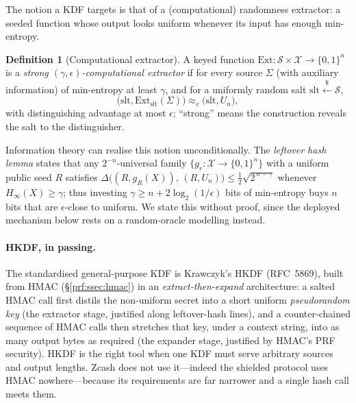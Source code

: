 \documentclass[11pt,a4paper]{article}
\theoremstyle{definition}
\newtheorem{definition}[theorem]{Definition}
\theoremstyle{remark}
\begin{document}
The notion a KDF targets is that of a (computational) randomness extractor: a seeded function whose output looks uniform whenever its input has enough min-entropy.

\begin{definition}[Computational extractor]\label{symmetric:def-extractor}
A keyed function \(\mathrm{Ext} : \mathcal{S} \times \mathcal{X} \to \{0,1\}^n\) is a \emph{strong \((\gamma, \epsilon)\)-computational extractor} if for every source \(\Sigma\) (with auxiliary information) of min-entropy at least \(\gamma\), and for a uniformly random salt \(\mathrm{slt} \xleftarrow{\$}\mathcal{S}\),
\[
  \bigl(\mathrm{slt}, \mathrm{Ext}_{\mathrm{slt}}(\Sigma)\bigr) \approx_c \bigl(\mathrm{slt}, U_n\bigr),
\]
with distinguishing advantage at most \(\epsilon\); ``strong'' means the construction reveals the salt to the distinguisher.
\end{definition}

Information theory can realise this notion unconditionally. The \emph{leftover hash lemma} states that any \(2^{-n}\)-universal family \(\{g_r : \mathcal{X} \to \{0,1\}^n\}\) with a uniform public seed \(R\) satisfies \(\Delta\bigl((R, g_R(X)),\, (R, U_n)\bigr) \le \tfrac12\sqrt{2^{\,n-\gamma}}\) whenever \(H_\infty(X) \ge \gamma\); thus investing \(\gamma \ge n + 2\log_2(1/\epsilon)\) bits of min-entropy buys \(n\) bits that are \(\epsilon\)-close to uniform. We state this without proof, since the deployed mechanism below rests on a random-oracle modelling instead.

\paragraph{HKDF, in passing.} The standardised general-purpose KDF is Krawczyk's \textsf{HKDF} (RFC~5869), built from HMAC (\S\ref{prf:ssec:hmac}) in an \emph{extract-then-expand} architecture: a salted HMAC call first distils the non-uniform secret into a short uniform \emph{pseudorandom key} (the extractor stage, justified along leftover-hash lines), and a counter-chained sequence of HMAC calls then stretches that key, under a context string, into as many output bytes as required (the expander stage, justified by HMAC's PRF security). HKDF is the right tool when one KDF must serve arbitrary sources and output lengths. Zcash does not use it---indeed the shielded protocol uses HMAC nowhere---because its requirements are far narrower and a single hash call meets them.
\end{document}

